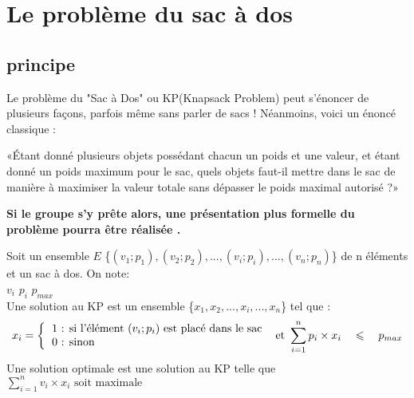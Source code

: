 \documentclass[12pt,french]{article}
\begin{document}
\section{Le problème du sac à dos}
\subsection{principe}
Le problème du "Sac à Dos" ou KP(Knapsack Problem) peut s'énoncer de plusieurs façons, parfois même sans parler de sacs ! Néanmoins, voici un énoncé classique :

\begin{tcolorbox}[enhanced,attach boxed title to top center={yshift=-3mm,yshifttext=-1mm},
	colback=blue!5!white,colframe=blue!75!black,colbacktitle=blue!25!black,
	title=Enoncé classique du KP, fonttitle=\bfseries,
	boxed title style={size=small,colframe=blue!25!black} ]
	«Étant  donné  plusieurs  objets  possédant chacun  un  poids  et  une  valeur,  et  étant  donné  un  poids  maximum  pour  le  sac,  quels  objets faut-il  mettre  dans  le  sac  de  manière  à  maximiser  la  valeur  totale  sans  dépasser  le  poids maximal autorisé ?»
\end{tcolorbox}
\small
\begin{tcolorbox}[enhanced,attach boxed title to top center={yshift=-3mm,yshifttext=-1mm},
	colback=red!5!white,colframe=red!75!black,colbacktitle=red!25!black,
	title=Note pour l'enseignant, fonttitle=\bfseries,
	boxed title style={size=small,colframe=red!25!black} ]
	\textbf{Si le groupe s'y prête alors, une présentation plus formelle du problème pourra être réalisée .}
\end{tcolorbox}
\begin{tcolorbox}[enhanced,attach boxed title to top center={yshift=-3mm,yshifttext=-1mm},
	colback=blue!5!white,colframe=blue!75!black,colbacktitle=blue!25!black,
	title=Présentation formelle, fonttitle=\bfseries,
	boxed title style={size=small,colframe=blue!25!black} ]
	Soit un ensemble $E$  \{$(v_1;p_1), (v_2;p_2),...,(v_i;p_i),...,(v_n;p_n)$\} de n éléments et un sac à dos. On note:\\
	$v_i$ \hfill $p_i$ \hfill $p_{max}$ \\
	Une solution au KP est un ensemble  \{$x_1, x_2,...,x_i,...,x_n$\} tel que :
	$$x_i =
	\left \{
	\begin{tabular}{l}
	1   \text{: si l'élément $(v_i;p_i)$ est placé dans le sac}\\
	0  \text{: sinon}\\
	\end{tabular}
	\right .
	\text{ 
		et 
	}\sum_{i=1}^{n} p_i \times x_i \quad \leqslant \quad p_{max}$$
Une solution optimale est  une solution au KP telle que $\sum_{i=1}^{n} v_i \times x_i \text{ soit maximale}$
\end{tcolorbox}
\normalsize
\end{document}
